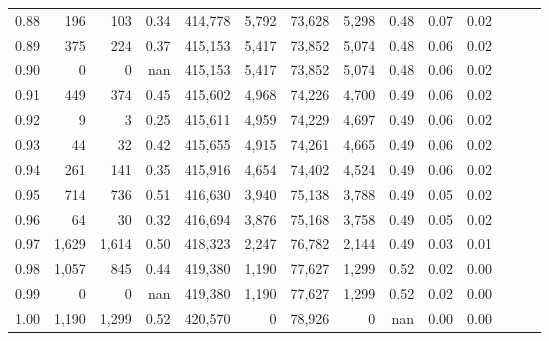 \begin{tabular}{rrrrrrrrrrrrrr}
0.88 &     196 &    103 &  0.34 &  414,778 &    5,792 &  73,628 &   5,298 &  0.48 &  0.07 &      0.02 \\
0.89 &     375 &    224 &  0.37 &  415,153 &    5,417 &  73,852 &   5,074 &  0.48 &  0.06 &      0.02 \\
0.90 &       0 &      0 &   nan &  415,153 &    5,417 &  73,852 &   5,074 &  0.48 &  0.06 &      0.02 \\
0.91 &     449 &    374 &  0.45 &  415,602 &    4,968 &  74,226 &   4,700 &  0.49 &  0.06 &      0.02 \\
0.92 &       9 &      3 &  0.25 &  415,611 &    4,959 &  74,229 &   4,697 &  0.49 &  0.06 &      0.02 \\
0.93 &      44 &     32 &  0.42 &  415,655 &    4,915 &  74,261 &   4,665 &  0.49 &  0.06 &      0.02 \\
0.94 &     261 &    141 &  0.35 &  415,916 &    4,654 &  74,402 &   4,524 &  0.49 &  0.06 &      0.02 \\
0.95 &     714 &    736 &  0.51 &  416,630 &    3,940 &  75,138 &   3,788 &  0.49 &  0.05 &      0.02 \\
0.96 &      64 &     30 &  0.32 &  416,694 &    3,876 &  75,168 &   3,758 &  0.49 &  0.05 &      0.02 \\
0.97 &   1,629 &  1,614 &  0.50 &  418,323 &    2,247 &  76,782 &   2,144 &  0.49 &  0.03 &      0.01 \\
0.98 &   1,057 &    845 &  0.44 &  419,380 &    1,190 &  77,627 &   1,299 &  0.52 &  0.02 &      0.00 \\
0.99 &       0 &      0 &   nan &  419,380 &    1,190 &  77,627 &   1,299 &  0.52 &  0.02 &      0.00 \\
1.00 &   1,190 &  1,299 &  0.52 &  420,570 &        0 &  78,926 &       0 &   nan &  0.00 &      0.00 \\
\bottomrule
\end{tabular}
